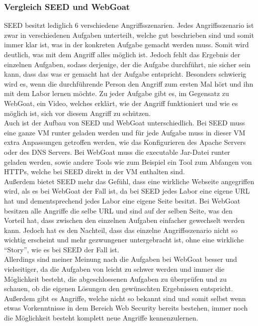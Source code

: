 \subsubsection{Vergleich SEED und WebGoat}
SEED besitzt lediglich 6 verschiedene Angriffsszenarien. Jedes Angriffsszenario ist zwar in verschiedenen Aufgaben unterteilt, welche gut beschrieben sind und somit immer klar ist, was in der konkreten Aufgabe gemacht werden muss. Somit wird deutlich, was mit dem Angriff alles möglich ist. Jedoch fehlt das Ergebnis der einzelnen Aufgaben, sodass derjenige, der die Aufgabe durchführt, nie sicher sein kann, dass das was er gemacht hat der Aufgabe entspricht. Besonders schwierig wird es, wenn die durchführende Person den Angriff zum ersten Mal hört und ihn mit dem Labor lernen möchte. Zu jeder Aufgabe gibt es, im Gegensatz zu WebGoat, ein Video, welches erklärt, wie der Angriff funktioniert und wie es möglich ist, sich vor diesem Angriff zu schützen. \\
Auch ist der Aufbau von SEED und WebGoat unterschiedlich. Bei SEED muss eine ganze VM runter geladen werden und für jede Aufgabe muss in dieser VM extra Anpassungen getroffen werden, wie das Konfigurieren des Apache Servers oder des DNS Servers. Bei WebGoat muss die executable Jar-Datei runter geladen werden, sowie andere Tools wie zum Beispiel ein Tool zum Abfangen von HTTPs, welche bei SEED direkt in der VM enthalten sind. \\
Außerdem bietet SEED mehr das Gefühl, dass eine wirkliche Webseite angegriffen wird, als es bei WebGoat der Fall ist, da bei SEED jedes Labor eine eigene URL hat und dementsprechend jedes Labor eine eigene Seite besitzt. Bei WebGoat besitzen alle Angriffe die selbe URL und sind auf der selben Seite, was den Vorteil hat, dass zwischen den einzelnen Aufgaben einfacher gewechselt werden kann. Jedoch hat es den Nachteil, dass das einzelne Angriffsszenario nicht so wichtig erscheint und mehr gezwungener untergebracht ist, ohne eine wirkliche \enquote{Story}, wie es bei SEED der Fall ist. \\
Allerdings sind meiner Meinung nach die Aufgaben bei WebGoat besser und vielseitiger, da die Aufgaben von leicht zu schwer werden und immer die Möglichkeit besteht, die abgeschlossenen Aufgaben zu überprüfen und zu schauen, ob die eigenen Lösungen den gewünschten Ergebnissen entspricht. Außerdem gibt es Angriffe, welche nicht so bekannt sind und somit selbst wenn etwas Vorkenntnisse in dem Bereich Web Security bereits bestehen, immer noch die Möglichkeit besteht komplett neue Angriffe kennenzulernen. 

 
